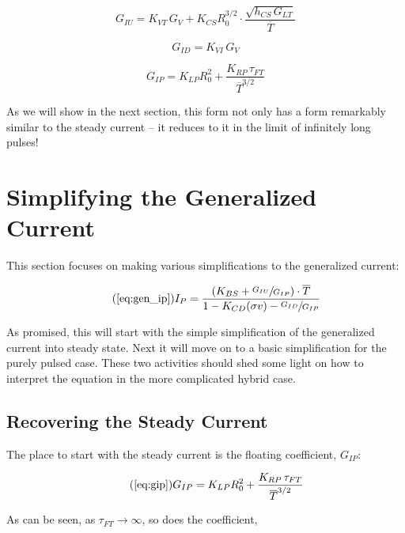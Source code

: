 \begin{equation}
	G_{IU} = K_{VT} \, G_V + K_{CS} R_0^{3/2} \cdot \frac{ \sqrt{ h_{CS} \, G_{LT} } }{ \overline T }
\end{equation}

\begin{equation}
	G_{ID} = K_{VI} \, G_V
\end{equation}

\begin{equation}
	\label{eq:gip}
	G_{IP} = K_{LP} R_0^2 + \frac{ K_{RP} \, \tau_{FT} }{ \overline T ^ {3/2} }
\end{equation}

As we will show in the next section, this form not only has a form remarkably similar to the steady current -- it reduces to it in the limit of infinitely long pulses!

\section{Simplifying the Generalized Current}

This section focuses on making various simplifications to the generalized current:

\begin{equation}
	\tag{\ref{eq:gen_ip}}
	I_P = \frac{ \left( K_{BS} + \sfrac{ G_{IU} }{ G_{IP} } \right) \cdot \overline T }{ 1 - K_{CD} ( \sigma v ) - \sfrac{ G_{ID} }{ G_{IP} } }
\end{equation}

As promised, this will start with the simple simplification of the generalized current into steady state. Next it will move on to a basic simplification for the purely pulsed case. These two activities should shed some light on how to interpret the equation in the more complicated hybrid case.

\subsection{Recovering the Steady Current}

The place to start with the steady current is the floating coefficient, $G_{IP}$:

\begin{equation}
	\tag{\ref{eq:gip}}
	G_{IP} = K_{LP} R_0^2 + \frac{ K_{RP} \, \tau_{FT} }{ \overline T ^ {3/2} }
\end{equation}

As can be seen, as $\tau_{FT} \to \infty$, so does the coefficient,

